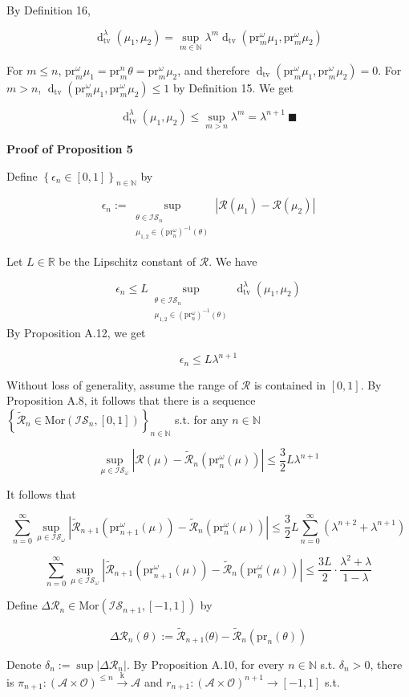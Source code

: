 \documentclass[a4paper]{article}
\newcommand{\Co}[1]{}
\newcommand{\AP}[1]{\left(#1\right)}
\newcommand{\AB}[1]{\left[#1\right]}
\newcommand{\AC}[1]{\left\{#1\right\}}
\newcommand{\Abs}[1]{\left\vert #1 \right\vert}
\newcommand{\Dtv}{\operatorname{d}_{\text{tv}}}
\newcommand{\Nats}{\mathbb{N}}
\newcommand{\Reals}{\mathbb{R}}
\newcommand{\Mor}{\mathrm{Mor}}
\newcommand{\K}{\xrightarrow{\mathrm{k}}}
\newcommand{\A}{\mathcal{A}}
\newcommand{\Ob}{\mathcal{O}}
\newcommand{\AO}{\AP{\A\times\Ob}}
\newcommand{\R}{\mathcal{R}}
\newcommand{\IS}{\mathcal{IS}}
\newcommand{\Prj}{\mathrm{pr}}
\newcommand{\Prjo}{\mathrm{pr}^\omega_n}
\begin{document}
By Definition 16,

$$\Dtv^\lambda\AP{\mu_1,\mu_2}=\sup_{m\in\Nats}{\lambda^m\Dtv\AP{\Prj^\omega_m\mu_1,\Prj^\omega_m\mu_2}}$$

For $m\leq n$, $\Prj^\omega_m\mu_1=\Prj^n_m\theta=\Prj^\omega_m\mu_2$, and therefore $\Dtv\AP{\Prj^\omega_m\mu_1,\Prj^\omega_m\mu_2}=0$. For $m>n$, $\Dtv\AP{\Prj^\omega_m\mu_1,\Prj^\omega_m\mu_2}\leq 1$ by Definition 15. We get

$$\Dtv^\lambda\AP{\mu_1,\mu_2}\leq\sup_{m>n}{\lambda^m}=\lambda^{n+1}\ \blacksquare$$

\textbf{Proof of Proposition 5}\Co{b}

Define $\AC{\epsilon_n\in[0,1]}_{n\in\Nats}$ by

$$\epsilon_n:=\sup_{\substack{\theta\in\IS_n\\\mu_{1,2}\in\AP{\Prjo}^{-1}(\theta)}}\Abs{\R\AP{\mu_1}-\R\AP{\mu_2}}$$

Let $L\in\Reals$ be the Lipschitz constant of $\R$. We have

$$\epsilon_n\leq L \sup_{\substack{\theta\in\IS_n\\\mu_{1,2}\in\AP{\Prjo}^{-1}(\theta)}}\Dtv^\lambda\AP{\mu_1,\mu_2}$$ 
By Proposition A.12, we get

$$\epsilon_n\leq L\lambda^{n+1}$$

Without loss of generality, assume the range of $\R$ is contained in $[0,1]$. By Proposition A.8, it follows that there is a sequence $\AC{\tilde{\R}_n\in\Mor\AP{\IS_n,[0,1]}}_{n\in\Nats}$ s.t. for any $n\in\Nats$

$$\sup_{\mu\in\IS_\omega}\Abs{\R(\mu)-\tilde{\R}_n\AP{\Prjo(\mu)}}\leq\frac{3}{2}L\lambda^{n+1}$$

It follows that

$$\sum_{n=0}^\infty \sup_{\mu\in\IS_\omega}\Abs{\tilde{\R}_{n+1}\AP{\Prj^\omega_{n+1}\AP{\mu}}-\tilde{\R}_n\AP{\Prj^\omega_n(\mu)}}\leq\frac{3}{2}L\sum_{n=0}^\infty\AP{\lambda^{n+2}+\lambda^{n+1}}$$

$$\sum_{n=0}^\infty \sup_{\mu\in\IS_\omega}\Abs{\tilde{\R}_{n+1}\AP{\Prj^\omega_{n+1}\AP{\mu}}-\tilde{\R}_{n}\AP{\Prj^\omega_n(\mu)}}\leq\frac{3L}{2}\cdot\frac{\lambda^2+\lambda}{1-\lambda}$$

Define $\Delta\R_n\in\Mor\AP{\IS_{n+1},[-1,1]}$ by

$$\Delta\R_n(\theta):=\tilde{\R}_{n+1}\big(\theta\big)-\tilde{\R}_{n}\AP{\Prj_n(\theta)}$$

Denote $\delta_n:=\sup\Abs{\Delta\R_n}$. By Proposition A.10, for every $n\in\Nats$ s.t. $\delta_n>0$, there is $\pi_{n+1}:\AO^{\leq n}\K\A$ and $r_{n+1}:\AO^{n+1}\rightarrow\AB{-1,1}$ s.t.
\end{document}
